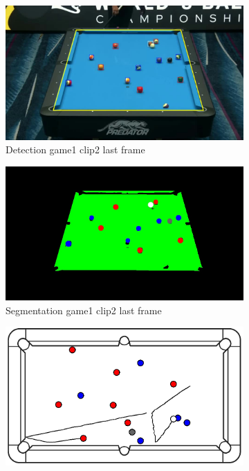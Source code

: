 \begin{figure}[H]
\begin{subfigure}[b]{0.48\textwidth}
        \centering
        \includegraphics[width=\textwidth]{images/Detection/game1_clip2_detected_balls_last_frame.jpg}
        \caption{Detection game1 clip2 last frame}
        \label{fig: game1_clip2_last_frame_detected}
    \end{subfigure}
    \begin{subfigure}[b]{0.48\textwidth}
        \centering
        \includegraphics[width=\textwidth]{images/Segmentation/game1_clip2_segmented_balls_last_frame.jpg}
        \caption{Segmentation game1 clip2 last frame}
		\label{fig: game1_clip2_last_frame_segmented}
    \end{subfigure}
    \begin{subfigure}[b]{0.48\textwidth}
    	\centering
    	\includegraphics[width=\textwidth]{images/AllMinimap/game1_clip2_minimap.png}

\end{subfigure}
\end{figure}
